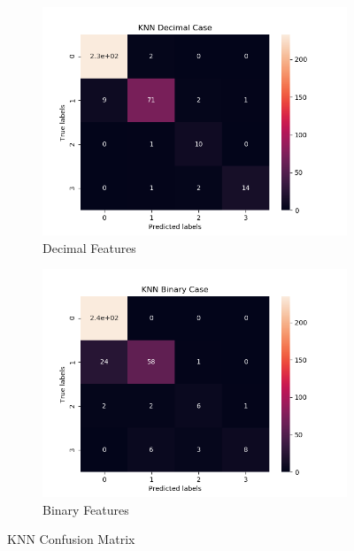 \begin{figure}[H]
     \centering
     
     \begin{subfigure}[b]{0.48\textwidth}
         \centering
         \includegraphics[width=\textwidth]{../Figures/KNN Decimal Case_conf_mat.png}
         \caption{Decimal Features}
     \end{subfigure}
     \hfill
     \begin{subfigure}[b]{0.48\textwidth}
         \centering
         \includegraphics[width=\textwidth]{../Figures/KNN Binary Case_conf_mat.png}
         \caption{Binary Features}
     \end{subfigure}
     \caption{KNN Confusion Matrix}
\end{figure}


